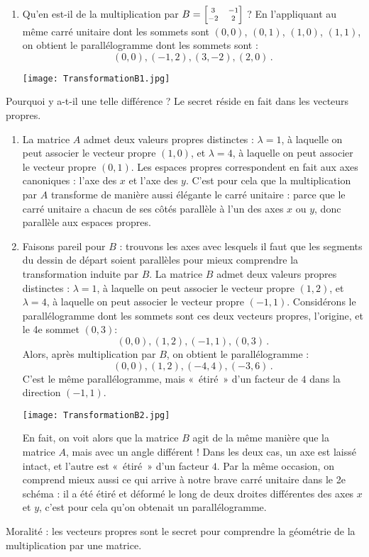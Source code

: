 \begin{myexample}
\begin{enumerate}[(1)]
	\item Qu'en est-il de la multiplication par $B = \scriptsize\left[ \begin{matrix} 3&-1\\-2&2 \end{matrix} \right]$ ?  En l'appliquant
au m\^eme carré unitaire dont les sommets sont $(0,0)$, $(0,1)$, $(1,0)$, $(1,1)$, on obtient le parallélogramme dont les sommets sont :
$$
(0,0), (-1,2), (3,-2), (2,0)\,.
$$
\begin{center}
\texttt{[image: TransformationB1.jpg]}
\end{center}
\end{enumerate}
Pourquoi y a-t-il une telle différence ?  
Le secret réside en fait dans les vecteurs propres. 
\begin{enumerate}[(1')]
	\item La matrice $A$ admet deux valeurs propres distinctes : $\lambda = 1$, à laquelle on peut associer le vecteur propre $(1,0)$, et $\lambda =4$, à laquelle on peut associer le vecteur propre $(0,1)$. Les espaces propres correspondent en fait aux axes canoniques : l'axe des $x$ et l'axe des $y$. C'est pour cela que la multiplication par $A$ transforme de manière aussi élégante le carré unitaire : parce que le carré unitaire a chacun de ses côtés parallèle à l'un des axes $x$ ou $y$, donc parallèle aux espaces propres.
	\item Faisons pareil pour $B$ : trouvons les axes avec lesquels il faut que les segments du dessin de départ soient parallèles pour mieux comprendre la transformation induite par $B$. La matrice $B$ admet deux valeurs propres distinctes : $\lambda = 1$, à laquelle on peut associer le vecteur propre $(1,2)$, et $\lambda =4$, à laquelle on peut associer le vecteur propre $(-1,1)$.
Considérons le parallélogramme dont les sommets sont ces deux vecteurs propres, l'origine, et le 4e sommet $(0,3)$:
$$
(0,0), (1,2), (-1,1), (0,3)\,.
$$
Alors, après multiplication par $B$, on obtient le parallélogramme :
$$
(0,0), (1,2), (-4,4), (-3, 6)\,.
$$
C'est le même parallélogramme, mais «~étiré~» 
d'un facteur de $4$ dans la direction $(-1,1)$. 
\begin{center}
\texttt{[image: TransformationB2.jpg]}
\end{center}
En fait, on voit alors que la matrice $B$ agit de la même manière que la matrice $A$, mais avec un angle différent ! Dans les deux cas, un axe est laissé intact, et l'autre est «~étiré~» d'un facteur $4$.
Par la même occasion, on comprend mieux aussi ce qui arrive à notre brave carr\'e unitaire dans le 2e schéma : il
a été étiré et déformé le long de deux droites différentes des axes $x$ et $y$, c'est pour cela qu'on obtenait un parallélogramme.
\end{enumerate}
Moralit\'e : les vecteurs propres sont le secret pour comprendre
la géométrie de la multiplication par une matrice.
\end{myexample}

